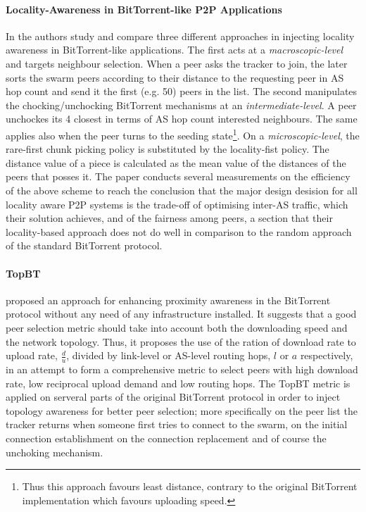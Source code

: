 \paragraph*{\bf Locality-Awareness in BitTorrent-like P2P Applications}
In \cite{lclx_bitlocal_2009} the authors study and compare three different
approaches in injecting locality awareness in BitTorrent-like applications. The
first acts at a \emph{macroscopic-level} and targets neighbour selection. When a
peer asks the tracker to join, the later sorts the swarm peers according to
their distance to the requesting peer in AS hop count and send it the first
(e.g. 50) peers in the list. The second manipulates the chocking/unchocking
BitTorrent mechanisms at an \emph{intermediate-level}. A peer unchockes its 4
closest in terms of AS hop count interested neighbours. The same applies also
when the peer turns to the seeding state\footnote{Thus this approach favours
least distance, contrary to the original BitTorrent implementation which favours
uploading speed.}. On a \emph{microscopic-level}, the rare-first chunk picking
policy is substituted by the locality-fist policy. The distance value of a piece
is calculated as the mean value of the distances of the peers that posses it.
The paper conducts several measurements on the efficiency of the above scheme to
reach the conclusion that the major design desision for all locality aware P2P
systems is the trade-off of optimising inter-AS traffic, which their solution
achieves, and of the fairness among peers, a section that their locality-based
approach does not do well in comparison to the random approach of the standard
BitTorrent protocol.

\paragraph*{\bf TopBT}
\cite{rtl_topbt_2010} proposed an approach for enhancing proximity awareness
in the BitTorrent protocol without any need of any infrastructure installed. It
suggests that a good peer selection metric should take into account both the
downloading speed and the network topology. Thus, it proposes the use of the
ration of download rate to upload rate, $\frac{d}{u}$, divided by link-level or
AS-level routing hops, $l$ or $a$ respectively, in an attempt to form a
comprehensive metric to select peers with high download rate, low reciprocal
upload demand and low routing hops. The TopBT metric is applied on serveral
parts of the original BitTorrent protocol in order to inject topology awareness
for better peer selection; more specifically on the peer list the tracker
returns when someone first tries to connect to the swarm, on the initial
connection establishment on the connection replacement and of course the
unchoking mechanism.

